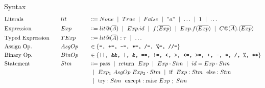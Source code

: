 \documentclass[11pt]{jarticle}
\begin{document}
Syntax
\begin{alignat*}{3} %
  &\text{Literals} &&lit &&\Coloneqq None ~\mid~ True ~\mid~ False ~\mid~ "a" ~\mid~ \dots ~\mid~ 1 ~\mid~ \dots\\
  &\text{Expression}~~~ &&Exp &&\Coloneqq lit@(\overline{A}) ~\mid~ Exp.id  ~\mid~ f(\overline{Exp}) ~\mid~ Exp.f(\overline{Exp}) ~\mid~ C@(\overline{A}).(\overline{Exp})\\
  &\text{Typed Expression}~~~ &&TExp &&\Coloneqq lit@(\overline{A}):\tau ~\mid~ \dots\\
  &\text{Assign Op.} &&AsgOp~~~ &&\in \{\texttt{=, +=, -=, *=, /=, \%=, //=}\}\\
  &\text{Binary Op.} &&BinOp &&\in \{\texttt{||, \&\&, |, \&, ==, !=, <, >, <=, >=, +, -, *, /, \%, **}\}\\
  &\text{Statement} &&Stm &&\Coloneqq \text{pass} ~\mid~ \text{return}~~ Exp ~\mid~ Exp \cdot Stm ~\mid~ id = Exp \cdot Stm \\
  &&&&& ~\mid~ Exp_1~AsgOp~Exp_2 \cdot Stm ~\mid~ \text{if}~~Exp:Stm~~\text{else}:Stm\\
  &&&&& ~\mid~ \text{try}:Stm ~~ \text{except}:\text{raise}~Exp~;~Stm
\end{alignat*}
\end{document}
